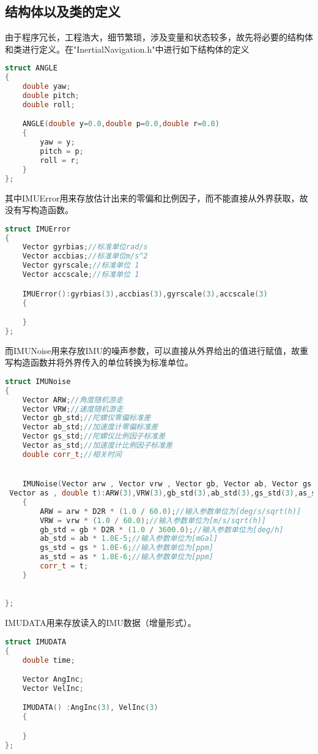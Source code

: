 \documentclass[codepkg=listings,theme=fancy]{course-report}
\begin{document}
\subsection{结构体以及类的定义}
由于程序冗长，工程浩大，细节繁琐，涉及变量和状态较多，故先将必要的结构体和类进行定义。在"InertialNavigation.h"中进行如下结构体的定义
\begin{lstlisting}[language=C++]
struct ANGLE
{
	double yaw;
	double pitch;
	double roll;

	ANGLE(double y=0.0,double p=0.0,double r=0.0)
	{
		yaw = y;
		pitch = p;
		roll = r;
	}
};
\end{lstlisting}
其中IMUError用来存放估计出来的零偏和比例因子，而不能直接从外界获取，故没有写构造函数。
\begin{lstlisting}[language=C++,emph={Matrix,ANGLE,Vector,IMUError,IMUDATA,IMUNoise,GNSSDATA,IMUBOX},emphstyle=\color{cyan}]
struct IMUError
{
	Vector gyrbias;//标准单位rad/s
	Vector accbias;//标准单位m/s^2
	Vector gyrscale;//标准单位 1
	Vector accscale;//标准单位 1

	IMUError():gyrbias(3),accbias(3),gyrscale(3),accscale(3)
	{

	}
};
\end{lstlisting}
而IMUNoise用来存放IMU的噪声参数，可以直接从外界给出的值进行赋值，故重写构造函数并将外界传入的单位转换为标准单位。
\begin{lstlisting}[language=C++,emph={Matrix,ANGLE,Vector,IMUError,IMUDATA,IMUNoise,GNSSDATA,IMUBOX},emphstyle=\color{cyan}]
struct IMUNoise
{
	Vector ARW;//角度随机游走
	Vector VRW;//速度随机游走
	Vector gb_std;//陀螺仪零偏标准差
	Vector ab_std;//加速度计零偏标准差
	Vector gs_std;//陀螺仪比例因子标准差
	Vector as_std;//加速度计比例因子标准差
	double corr_t;//相关时间


	IMUNoise(Vector arw , Vector vrw , Vector gb, Vector ab, Vector gs  ,
 Vector as , double t):ARW(3),VRW(3),gb_std(3),ab_std(3),gs_std(3),as_std(3)
	{
		ARW = arw * D2R * (1.0 / 60.0);//输入参数单位为[deg/s/sqrt(h)]
		VRW = vrw * (1.0 / 60.0);//输入参数单位为[m/s/sqrt(h)]
		gb_std = gb * D2R * (1.0 / 3600.0);//输入参数单位为[deg/h]
		ab_std = ab * 1.0E-5;//输入参数单位为[mGal]
		gs_std = gs * 1.0E-6;//输入参数单位为[ppm]
		as_std = as * 1.0E-6;//输入参数单位为[ppm]
		corr_t = t;
	}

	
};
\end{lstlisting}
IMUDATA用来存放读入的IMU数据（增量形式）。
\begin{lstlisting}[language=C++,emph={Matrix,ANGLE,Vector,IMUError,IMUDATA,IMUNoise,GNSSDATA,IMUBOX},emphstyle=\color{cyan}]
struct IMUDATA
{
	double time;

	Vector AngInc;
	Vector VelInc;

	IMUDATA() :AngInc(3), VelInc(3)
	{

	}
};
\end{lstlisting}
\end{document}
